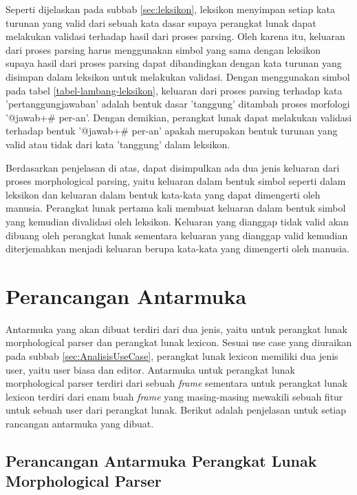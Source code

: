 Seperti dijelaskan pada subbab \ref{sec:leksikon}, leksikon menyimpan setiap kata turunan yang valid dari sebuah kata dasar supaya perangkat lunak dapat melakukan validasi terhadap hasil dari proses parsing. Oleh karena itu, keluaran dari proses parsing harus menggunakan simbol yang sama dengan leksikon supaya hasil dari proses parsing dapat dibandingkan dengan kata turunan yang disimpan dalam leksikon untuk melakukan validasi. Dengan menggunakan simbol pada tabel \ref{tabel-lambang-leksikon}, keluaran dari proses parsing terhadap kata 'pertanggungjawaban' adalah bentuk dasar 'tanggung' ditambah proses morfologi '@jawab+\# per-an'. Dengan demikian, perangkat lunak dapat melakukan validasi terhadap bentuk '@jawab+\# per-an' apakah merupakan bentuk turunan yang valid atau tidak dari kata 'tanggung' dalam leksikon.

Berdasarkan penjelasan di atas, dapat disimpulkan ada dua jenis keluaran dari proses morphological parsing, yaitu keluaran dalam bentuk simbol seperti dalam leksikon dan keluaran dalam bentuk kata-kata yang dapat dimengerti oleh manusia. Perangkat lunak pertama kali membuat keluaran dalam bentuk simbol yang kemudian divalidasi oleh leksikon. Keluaran yang dianggap tidak valid akan dibuang oleh perangkat lunak sementara keluaran yang dianggap valid kemudian diterjemahkan menjadi keluaran berupa kata-kata yang dimengerti oleh manusia.

\section{Perancangan Antarmuka}
\label{sec:perancanganAntarmuka}

Antarmuka yang akan dibuat terdiri dari dua jenis, yaitu untuk perangkat lunak morphological parser dan perangkat lunak lexicon. Sesuai use case yang diuraikan pada subbab \ref{sec:AnalisisUseCase}, perangkat lunak lexicon memiliki dua jenis user, yaitu user biasa dan editor. Antarmuka untuk perangkat lunak morphological parser terdiri dari sebuah \textit{frame} sementara untuk perangkat lunak lexicon terdiri dari enam buah \textit{frame} yang masing-masing mewakili sebuah fitur untuk sebuah user dari perangkat lunak. Berikut adalah penjelasan untuk setiap rancangan antarmuka yang dibuat.

\subsection{Perancangan Antarmuka Perangkat Lunak Morphological Parser}
\label{sec:antarmukaParser}

